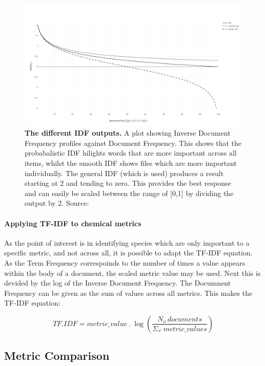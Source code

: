\begin{figure}[H]
     \centering
         \includegraphics[width=\textwidth]{figures_c3/mlpregressor/plotidf.png}
        \caption{ \textbf{The different IDF outputs.} A plot showing Inverse Document Frequency profiles against Document Frequency. This shows that the probabalistic IDF hilights words that are more important across all items, whilst the smooth IDF shows files which are more important individually. The general IDF (which is used) produces a result starting at 2 and tending to zero. This provides the best response and can easily be scaled between the range of [0,1] by dividing the output by 2.  Source: \citep{idfpic}}
        \label{fig:idf}
\end{figure}


\paragraph*{Applying TF-IDF to chemical metrics}
As the point of interest is in identifying species which are only important to a specific metric, and not across all, it is possible to adapt the TF-IDF equation. As the Term Frequency correspoinds to the number of times a value appears within the body of a document, the scaled metric value may be used. Next this is devided by the log of the Inverse Document Frequency. The Documnent Frequency can be given as the sum of values across all metrics. This makes the TF-IDF equation: 

\begin{equation}
    TF.IDF = metric\_value\  .\ \log(\frac{N_o\ documents}{ \Sigma_\forall\ metric\_values})
\end{equation}




\subsection{Metric Comparison}

